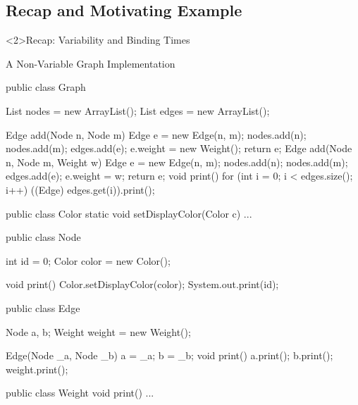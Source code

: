 


\subsection{Recap and Motivating Example}

\begin{frame}<2>{Recap: Variability and Binding Times}
	\frameVariabilityAndBindingTimes
\end{frame}

\begin{frame}[fragile]{A Non-Variable Graph Implementation}
	\begin{tiny}
		\begin{mycolumns}
\begin{codetight}{}
public class Graph {
	List nodes = new ArrayList();
	List edges = new ArrayList();

	Edge add(Node n, Node m) {
		Edge e = new Edge(n, m);
		nodes.add(n); nodes.add(m); edges.add(e);
		e.weight = new Weight();
		return e;
	}
	Edge add(Node n, Node m, Weight w) {
		Edge e = new Edge(n, m);
		nodes.add(n); nodes.add(m); edges.add(e);
		e.weight = w;
		return e;
	}
	void print() {
		for (int i = 0; i < edges.size(); i++) {
			((Edge) edges.get(i)).print();
		}
	}
}
\end{codetight}
\begin{codetight}{}
public class Color {
	static void setDisplayColor(Color c) {...}
}
\end{codetight}	
			\mynextcolumn
\begin{codetight}{}
public class Node {
	int id = 0;
	Color color = new Color();

	void print() {
		Color.setDisplayColor(color);
		System.out.print(id);
	}
}
\end{codetight}
\begin{codetight}{}
public class Edge {
	Node a, b;
	Weight weight = new Weight();

	Edge(Node _a, Node _b) {
		a = _a; b = _b;
	}
	void print() {
		a.print(); b.print();
		weight.print();
	}
}
\end{codetight}
\begin{codetight}{}
public class Weight {
	void print() {...}
}
\end{codetight}
		\end{mycolumns}
	\end{tiny}
\end{frame}

